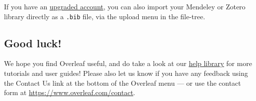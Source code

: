 \documentclass{article}
\begin{document}
If you have an \href{https://www.overleaf.com/user/subscription/plans}{upgraded account}, you can also import your Mendeley or Zotero library directly as a \verb|.bib| file, via the upload menu in the file-tree.

\subsection{Good luck!}

We hope you find Overleaf useful, and do take a look at our \href{https://www.overleaf.com/learn}{help library} for more tutorials and user guides! Please also let us know if you have any feedback using the Contact Us link at the bottom of the Overleaf menu --- or use the contact form at \url{https://www.overleaf.com/contact}.



\end{document}
